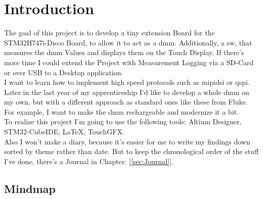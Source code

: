 \chapter{Introduction}
\label{cha:Introduction}


The goal of this project is to develop a tiny extension Board for the STM32H747i-Disco Board, to allow it to act as a \acs{dmm}. Additionally, a \acs{sw}, that measures the \acs{dmm} Values and displays them on the Touch Display. If there's more time I could extend the Project with Measurement Logging via a SD-Card or over USB to a Desktop application.
\\
I want to learn how to implement high speed protocols such as \acs{mipidsi} or \acs{qspi}. Later in the last year of my apprenticeship I'd like to develop a whole \acs{dmm} on my own, but with a different approach as standard ones like these from Fluke. For example, I want to make the \acs{dmm} rechargeable and modernize it a bit. 
\\
To realize this project I'm going to use the following tools: Altium Designer, STM32-CubeIDE, LaTeX, TouchGFX.
\\
Also I won't make a diary, because it's easier for me to write my findings down sorted by theme rather than date. But to keep the chronological order of the stuff I've done, there's a Journal in Chapter: [\ref{sec:Journal}].

\newpage

\section{Mindmap}
\label{sec:Mindmap}

\vspace{1cm}


